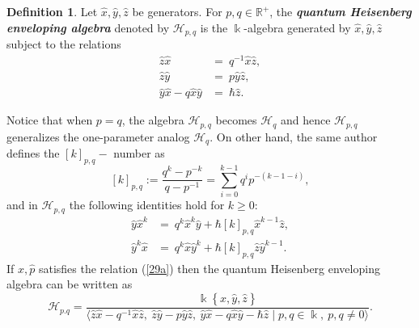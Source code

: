 \documentclass[12pt,a4paper]{article}
\theoremstyle{plain}
\theoremstyle{definition}
\newtheorem{definition}[theorem]{Definition}
\theoremstyle{remark}
\begin{document}
\begin{definition}\cite{Jasson-Gaddis2016}
   Let $\hat{x},\hat{y},\hat{z}$ be generators.  For $p,q\in\mathbb{R}^{+}$, the \textit{\textbf{quantum Heisenberg enveloping algebra}} denoted by $\mathcal{H}_{p,q}$ is the $\Bbbk$-algebra generated by $\hat{x},\hat{y},\hat{z}$ subject to the relations
\begin{align}\label{29a}
    \hat{z}\hat{x} & = \ q^{-1}\hat{x}\hat{z},\\
    \label{env-Heis1}\hat{z}\hat{y} & = \ p\hat{y}\hat{z}, \\
    \label{env-Heis2}\hat{y}\hat{x}-q\hat{x}\hat{y} & = \ \hbar\hat{z}.
\end{align} 
\end{definition}
Notice that when $p=q$, the algebra $\mathcal{H}_{p,q}$ becomes $\mathcal{H}_{q}$ and hence $\mathcal{H}_{p,q}$ generalizes the one-parameter analog $\mathcal{H}_{q}$. On other hand, the same author defines the $[k]_{p,q}-$ number as
\begin{equation}\label{29b}
    [k]_{p,q} := \frac{q^{k}-p^{-k}}{q-p^{-1}}=\sum\limits_{i=0}^{k-1}q^{i}p^{-(k-1-i)},
\end{equation}
and in $\mathcal{H}_{p,q}$ the following identities hold for $k\geq 0$:
\begin{align}
    \label{29c}\hat{y}\hat{x}^{k} & = \ q^{k}\hat{x}^{k}\hat{y}+\hbar [k]_{p,q}\hat{x}^{k-1}\hat{z},\\
    \label{29d}\hat{y}^{k}\hat{x} & = \ q^{k}\hat{x}\hat{y}^{k}+\hbar[k]_{p,q}\hat{z}\hat{y}^{k-1}.
\end{align}
If $\hat{x}, \hat{p}$ satisfies the relation (\ref{29a}) then the quantum Heisenberg enveloping algebra can be written as 
    \begin{equation*}
        \mathcal{H}_{p.q}=\frac{\Bbbk\left\{ \hat{x}, \hat{y}, \hat{z} \right\} }{ \langle \hat{z}\hat{x} - q^{-1} \hat{x}\hat{z}, \ \hat{z}\hat{y} - p\hat{y} \hat{z}, \ \hat{y} \hat{x} - q \hat{x} \hat{y}-\hbar\hat{z} \mid p,q\in \Bbbk, \ p,q\neq 0 \rangle}.
    \end{equation*}
\end{document}
